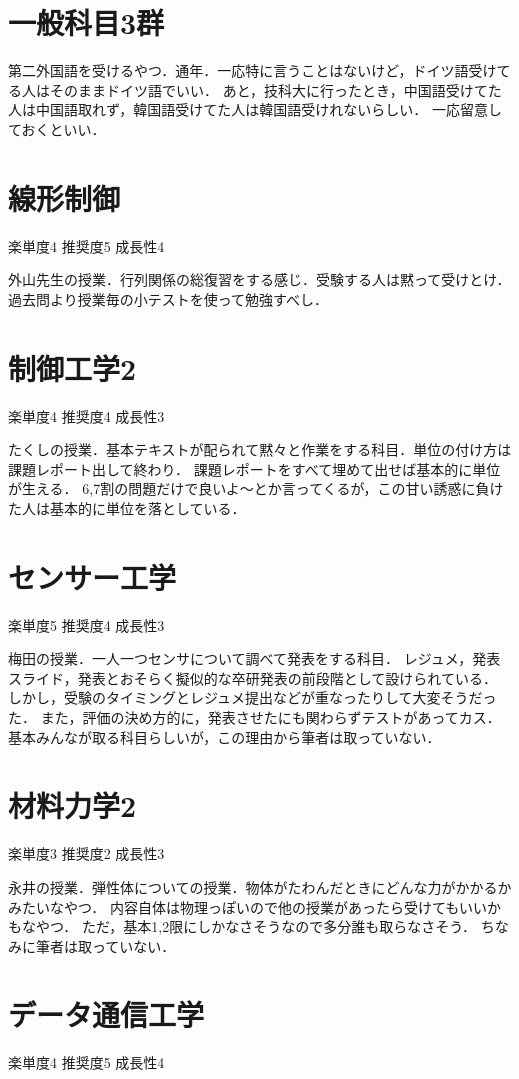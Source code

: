 \documentclass[titlepage]{jarticle}
\begin{document}
\section*{一般科目3群}
第二外国語を受けるやつ．通年．一応特に言うことはないけど，ドイツ語受けてる人はそのままドイツ語でいい．
あと，技科大に行ったとき，中国語受けてた人は中国語取れず，韓国語受けてた人は韓国語受けれないらしい．
一応留意しておくといい．

\section*{線形制御}
楽単度4
推奨度5
成長性4

外山先生の授業．行列関係の総復習をする感じ．受験する人は黙って受けとけ．
過去問より授業毎の小テストを使って勉強すべし．
\section*{制御工学2}
楽単度4
推奨度4
成長性3

たくしの授業．基本テキストが配られて黙々と作業をする科目．単位の付け方は課題レポート出して終わり．
課題レポートをすべて埋めて出せば基本的に単位が生える．
6,7割の問題だけで良いよ～とか言ってくるが，この甘い誘惑に負けた人は基本的に単位を落としている．
\section*{センサー工学}
楽単度5
推奨度4
成長性3

梅田の授業．一人一つセンサについて調べて発表をする科目．
レジュメ，発表スライド，発表とおそらく擬似的な卒研発表の前段階として設けられている．
しかし，受験のタイミングとレジュメ提出などが重なったりして大変そうだった．
また，評価の決め方的に，発表させたにも関わらずテストがあってカス．
基本みんなが取る科目らしいが，この理由から筆者は取っていない．
\section*{材料力学2}
楽単度3
推奨度2
成長性3

永井の授業．弾性体についての授業．物体がたわんだときにどんな力がかかるかみたいなやつ．
内容自体は物理っぽいので他の授業があったら受けてもいいかもなやつ．
ただ，基本1,2限にしかなさそうなので多分誰も取らなさそう．
ちなみに筆者は取っていない．

\section*{データ通信工学}
楽単度4
推奨度5
成長性4
\end{document}
